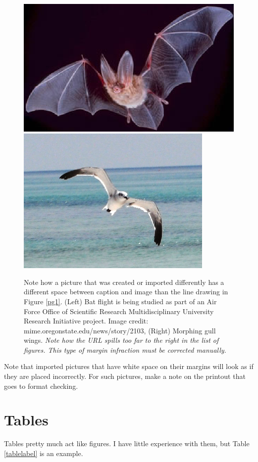 \begin{figure}[h] %
\begin{center}
\includegraphics[width=.45\linewidth]{figs/bat_b.eps}\hspace*{0.04in}
\includegraphics[width=.36\linewidth]{figs/gull2_b.eps}\\
\end{center}
\vspace{-.1in}

\caption
{
Note how a picture that was created or imported differently has a different
space between caption and image than the line drawing in Figure
\protect\ref{pg1}. (Left) Bat flight is being studied as part of an
Air Force Office of Scientific Research Multidisciplinary
University Research Initiative project.
Image credit: mime.oregonstate.edu/news/story/2103, (Right)
Morphing gull wings.
{\em Note how the URL spills too far to the right in the
list of figures. This type of margin infraction must be
corrected manually.}}
\label{batgull2}
\end{figure}



Note that imported pictures that have white space on their margins
will look
as if they are placed incorrectly. For such pictures,
make a note on the printout that goes to format checking.



\section{Tables}

Tables pretty much act like figures.
I have little experience with them, but
Table \ref{tablelabel}
is an example.



